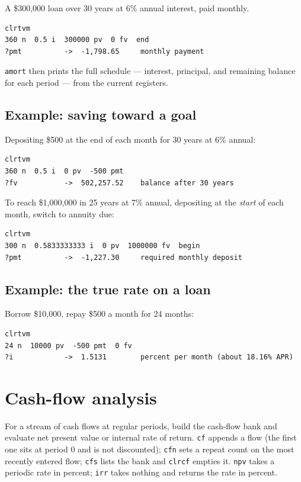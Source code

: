\documentclass[11pt]{article}
\newcommand{\w}[1]{\texttt{#1}}
\begin{document}
A \$300{,}000 loan over 30 years at 6\% annual interest, paid monthly.

\begin{lstlisting}
clrtvm
360 n  0.5 i  300000 pv  0 fv  end
?pmt          ->  -1,798.65     monthly payment
\end{lstlisting}

\w{amort} then prints the full schedule --- interest, principal, and remaining
balance for each period --- from the current registers.

\subsection{Example: saving toward a goal}

Depositing \$500 at the end of each month for 30 years at 6\% annual:

\begin{lstlisting}
clrtvm
360 n  0.5 i  0 pv  -500 pmt
?fv           ->  502,257.52    balance after 30 years
\end{lstlisting}

To reach \$1{,}000{,}000 in 25 years at 7\% annual, depositing at the
\emph{start} of each month, switch to annuity due:

\begin{lstlisting}
clrtvm
300 n  0.5833333333 i  0 pv  1000000 fv  begin
?pmt          ->  -1,227.30     required monthly deposit
\end{lstlisting}

\subsection{Example: the true rate on a loan}

Borrow \$10{,}000, repay \$500 a month for 24 months:

\begin{lstlisting}
clrtvm
24 n  10000 pv  -500 pmt  0 fv
?i            ->  1.5131        percent per month (about 18.16% APR)
\end{lstlisting}

\section{Cash-flow analysis}

For a stream of cash flows at regular periods, build the cash-flow bank and
evaluate net present value or internal rate of return. \w{cf} appends a flow
(the first one sits at period 0 and is not discounted); \w{cfn} sets a repeat
count on the most recently entered flow; \w{cfs} lists the bank and \w{clrcf}
empties it. \w{npv} takes a periodic rate in percent; \w{irr} takes nothing and
returns the rate in percent.
\end{document}
